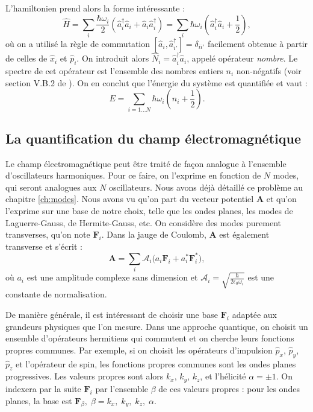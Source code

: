 L'hamiltonien prend alors la forme intéressante :
\begin{equation*}
\hat{H}=\sum_i \frac{\hbar\omega_i}{2}\left(\hat{a}^{\dag}_{i}\hat{a}_{i}+\hat{a}_{i}\hat{a}^{\dag}_{i}\right)
=\sum_i \hbar\omega_i\left(\hat{a}^{\dag}_{i}\hat{a}_{i}+\frac{1}{2}\right),
\end{equation*}
où on a utilisé la règle de commutation $\left[\hat{a}_{i},\hat{a}^{\dag}_{i'}\right] = \delta_{ii'}$ facilement obtenue à partir de celles de $\hat{x}_i$ et $\hat{p}_i$. On introduit alors $\hat{N}_i=\hat{a}^{\dag}_{i}\hat{a}_{i}$, appelé opérateur \textit{nombre}. Le spectre de cet opérateur est l'ensemble des nombres entiers $n_i$ non-négatifs (voir section V.B.2 de ). On en conclut que l'énergie du système est quantifiée et vaut :
\begin{equation*}
E = \sum_{i=1\ldots N} \hbar \omega_i (n_i + \frac{1}{2}).
\end{equation*}


\subsection{La quantification du champ électromagnétique}
\label{sec:quant_EM}
Le champ électromagnétique peut être traité de façon analogue à l'ensemble d'oscillateurs harmoniques. Pour ce faire, on l'exprime en fonction de $N$ modes, qui seront analogues aux $N$ oscillateurs. Nous avons déjà détaillé ce problème au chapitre \ref{ch:modes}. Nous avons vu qu'on part du vecteur potentiel $\bm{A}$ et qu'on l'exprime sur une base de notre choix, telle que les ondes planes, les modes de Laguerre-Gauss, de Hermite-Gauss, etc. On considère des modes purement transverses, qu'on note $\bm{F}_i$. Dans la jauge de Coulomb, $\bm{A}$ est également transverse et s'écrit :
\begin{equation}
\bm{A}=\sum_{i}{\mathcal{A}_i (a_{i}\bm{F}_i+a^*_{i}\bm{F}^*_i}),
\label{A_decomp_Flambda}
\end{equation}
où $a_{i}$ est une amplitude complexe sans dimension et $\mathcal{A}_i=\sqrt{\frac{\hbar}{2\epsilon_0\omega_i}}$ est une constante de normalisation. 

De manière générale, il est intéressant de choisir une base $\bm{F}_i$ adaptée aux grandeurs physiques que l'on mesure. Dans une approche quantique, on choisit un ensemble d'opérateurs hermitiens qui commutent et on cherche leurs fonctions propres communes. Par exemple, si on choisit les opérateurs d'impulsion $\hat{p}_x$, $\hat{p}_y$, $\hat{p}_z$ et l'opérateur de spin, les fonctions propres communes sont les ondes planes progressives. Les valeurs propres sont alors $k_x$, $k_y$, $k_z$, et l'hélicité $\alpha = \pm 1$. On indexera par la suite $\bm{F}_i$ par l'ensemble $\beta$ de ces valeurs propres : pour les ondes planes, la base est $\bm{F}_{\beta},\;\beta=k_x,\;k_y,\;k_z,\;\alpha$.

